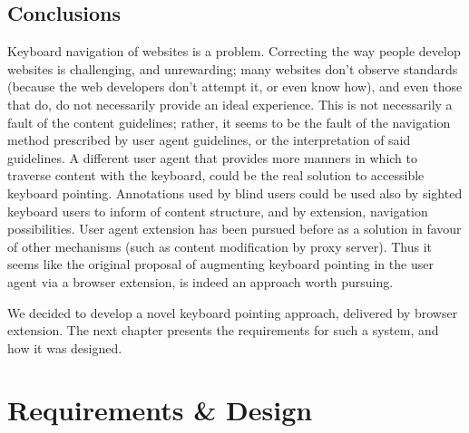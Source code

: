 \documentclass[11pt,openright,a4paper]{report}
\begin{document}
\section{Conclusions}
Keyboard navigation of websites is a problem. Correcting the way people develop websites is challenging, and unrewarding; many websites don't observe standards (because the web developers don't attempt it, or even know how), and even those that do, do not necessarily provide an ideal experience. This is not necessarily a fault of the content guidelines; rather, it seems to be the fault of the navigation method prescribed by user agent guidelines, or the interpretation of said guidelines. A different user agent that provides more manners in which to traverse content with the keyboard, could be the real solution to accessible keyboard pointing. Annotations used by blind users could be used also by sighted keyboard users to inform of content structure, and by extension, navigation possibilities. User agent extension has been pursued before as a solution in favour of other mechanisms (such as content modification by proxy server). Thus it seems like the original proposal of augmenting keyboard pointing in the user agent via a browser extension, is indeed an approach worth pursuing.

We decided to develop a novel keyboard pointing approach, delivered by browser extension. The next chapter presents the requirements for such a system, and how it was designed.
\chapter{Requirements \& Design}
\label{chap:reqanddesign}
\newcommand{\reqinit}{
    \newcounter{reqcountbackup}
    \newcounter{reqcount}
    \renewcommand{\thereqcount}{\textbf{R\arabic{reqcount}}}
}

\newcommand{\reqstart}{
    \begin{list}{\thereqcount}{\usecounter{reqcount}}
    \setcounter{reqcount}{\value{reqcountbackup}}
}
\end{document}

